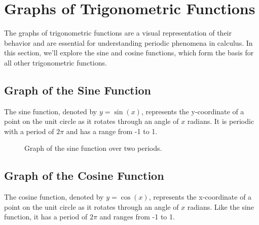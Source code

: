 \documentclass[a4paper,12pt]{book}
\begin{document}
\section{Graphs of Trigonometric Functions}
\label{sec:graphs_trig_functions}

The graphs of trigonometric functions are a visual representation of their behavior and are essential for understanding periodic phenomena in calculus. In this section, we'll explore the sine and cosine functions, which form the basis for all other trigonometric functions.

\subsection{Graph of the Sine Function}
The sine function, denoted by \( y = \sin(x) \), represents the y-coordinate of a point on the unit circle as it rotates through an angle of \( x \) radians. It is periodic with a period of \( 2\pi \) and has a range from -1 to 1.

\begin{figure}[h]
\centering
{}
\caption{Graph of the sine function over two periods.}
\label{fig:sine_graph}
\end{figure}

\subsection{Graph of the Cosine Function}
The cosine function, denoted by \( y = \cos(x) \), represents the x-coordinate of a point on the unit circle as it rotates through an angle of \( x \) radians. Like the sine function, it has a period of \( 2\pi \) and ranges from -1 to 1.
\end{document}
